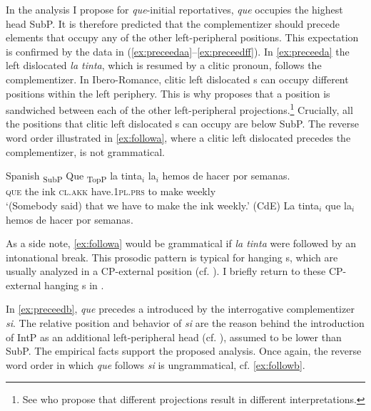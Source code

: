 In the analysis I propose for \emph{que}-initial reportatives,  \emph{que} occupies the highest head SubP. It is therefore predicted that the complementizer should precede elements that occupy any of the other left-peripheral positions. This expectation is confirmed by the data in  (\ref{ex:preceedaa}--\ref{ex:preceedff}). 
In \eqref{ex:preceeda} the left dislocated  \emph{la tinta}, which is resumed by a clitic pronoun, follows the complementizer. In Ibero-Romance, clitic left dislocated s can occupy different positions within the left periphery. This is why \citet{Rizzi1997}  proposes that a  position is sandwiched between each of the other left-peripheral projections.\footnote{See \citet{Frascarelli2007a} who propose that different  projections result in different  interpretations.}  Crucially, all the positions that  clitic left dislocated s can occupy are below SubP. The reverse word order illustrated in \eqref{ex:followa}, where a clitic left dislocated  precedes the complementizer, is not grammatical.\largerpage[-1]

\ea\label{ex:preceedaa} Spanish
	\ea 
	\gll
	{\ob}\textsubscript{SubP} Que{\cb} {\ob}\textsubscript{TopP} la tinta$_i${\cb} la$_i$ hemos de hacer {por semanas}. \\
	{} \textsc{que} {} the ink \textsc{cl.akk} have.\textsc{1pl.prs} to make weekly\\
	\glt `(Somebody said) that we have to make the ink weekly.' (CdE)\label{ex:preceeda}
	\ex * La tinta$_i$ que la$_i$ hemos de hacer por semanas. \label{ex:followa}
	\z
\z

As a side note, \eqref{ex:followa} would be grammatical if \emph{la tinta} were followed by an intonational break. This   prosodic pattern  is typical for  hanging s, which are usually analyzed in a CP-external position (cf. \citealt{Bianchi2010}). I briefly return to these CP-external hanging s  in .

In \eqref{ex:preceedb}, \emph{que} precedes a  introduced by the interrogative complementizer \emph{si}.  The relative position and behavior of \emph{si}  are the reason behind  the introduction of IntP as an additional left-peripheral head (cf. \citealt{Rizzi2001}), assumed to be lower than SubP. The empirical facts  support the proposed analysis. Once again, the reverse word order in which  \emph{que} follows \emph{si} is ungrammatical, cf. \eqref{ex:followb}.


